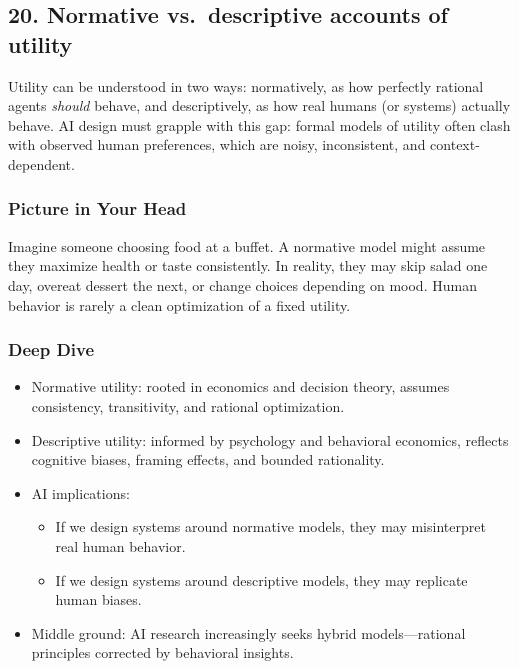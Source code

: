 \documentclass[
  letterpaper,
  DIV=11,
  numbers=noendperiod]{scrreprt}
\providecommand{\tightlist}{%
  \setlength{\itemsep}{0pt}\setlength{\parskip}{0pt}}
\begin{document}
\subsection{20. Normative vs.~descriptive accounts of
utility}\label{normative-vs.-descriptive-accounts-of-utility}

Utility can be understood in two ways: normatively, as how perfectly
rational agents \emph{should} behave, and descriptively, as how real
humans (or systems) actually behave. AI design must grapple with this
gap: formal models of utility often clash with observed human
preferences, which are noisy, inconsistent, and context-dependent.

\subsubsection{Picture in Your Head}\label{picture-in-your-head-19}

Imagine someone choosing food at a buffet. A normative model might
assume they maximize health or taste consistently. In reality, they may
skip salad one day, overeat dessert the next, or change choices
depending on mood. Human behavior is rarely a clean optimization of a
fixed utility.

\subsubsection{Deep Dive}\label{deep-dive-19}

\begin{itemize}
\item
  Normative utility: rooted in economics and decision theory, assumes
  consistency, transitivity, and rational optimization.
\item
  Descriptive utility: informed by psychology and behavioral economics,
  reflects cognitive biases, framing effects, and bounded rationality.
\item
  AI implications:

  \begin{itemize}
  \tightlist
  \item
    If we design systems around normative models, they may misinterpret
    real human behavior.
  \item
    If we design systems around descriptive models, they may replicate
    human biases.
  \end{itemize}
\item
  Middle ground: AI research increasingly seeks hybrid models---rational
  principles corrected by behavioral insights.
\end{itemize}
\end{document}
